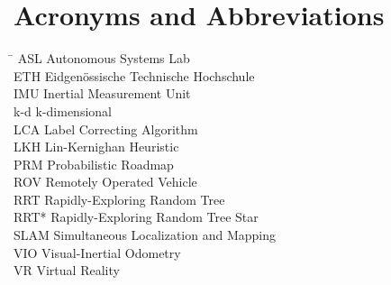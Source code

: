 \section*{Acronyms and Abbreviations}
\begin{tabbing}
 \hspace*{1.6cm}  \= \kill
 ASL \> Autonomous Systems Lab \\[0.5ex]
 ETH \> Eidgenössische Technische Hochschule \\[0.5ex]
 IMU \> Inertial Measurement Unit \\[0.5ex]
 k-d \> k-dimensional \\[0.5ex]
 LCA \> Label Correcting Algorithm \\[0.5ex]
 LKH \> Lin-Kernighan Heuristic \\[0.5ex]
 PRM \> Probabilistic Roadmap \\[0.5ex]
 ROV \> Remotely Operated Vehicle \\[0.5ex]
 RRT \> Rapidly-Exploring Random Tree \\[0.5ex] 
 RRT* \> Rapidly-Exploring Random Tree Star \\[0.5ex]
 SLAM \> Simultaneous Localization and Mapping \\[0.5ex]
 VIO \> Visual-Inertial Odometry \\[0.5ex]
 VR \> Virtual Reality \\[0.5ex]
\end{tabbing}